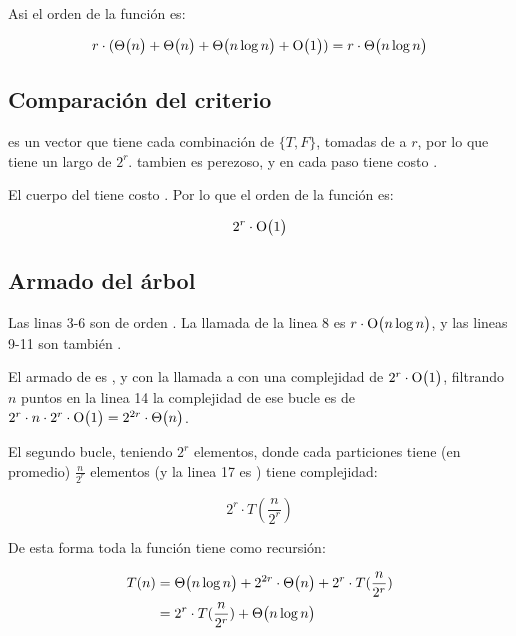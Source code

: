 Asi el orden de la función  es:

\[ r \cdot (\mathrm{\Theta}\bigl(n\bigr)+\mathrm{\Theta}\bigl(n\bigr)+\mathrm{\Theta}\bigl(n \log{n}\bigr) + \mathrm{O}\bigl(1\bigr)) \\
   = r \cdot \mathrm{\Theta}\bigl(n \log{n}\bigr)  \]

\subsection{Comparación del criterio}


 es un vector que tiene cada combinación de \(\{ T, F \}\),
tomadas de a \(r\), por lo que tiene un largo de \(2^r\). 
tambien es perezoso, y en cada paso tiene costo .

El cuerpo del  tiene costo . Por lo que el orden de la función es:

\[ 2^r \cdot \mathrm{O}\bigl(1\bigr) \]


\subsection{Armado del árbol}


Las linas 3-6 son de orden . La llamada de la linea 8 es
\(r \cdot \mathrm{O}\bigl(n \log{n}\bigr)\), y las lineas 9-11 son también .

El armado de  es , y con la llamada
a  con una complejidad de \(2^r \cdot \mathrm{O}\bigl(1\bigr)\),
filtrando \(n\) puntos en la linea 14 la complejidad de ese bucle es de
\( 2^r \cdot n \cdot 2^r \cdot \mathrm{O}\bigl(1\bigr) = 2^{2r} \cdot \mathrm{\Theta}\bigl(n\bigr)\).

El segundo bucle, teniendo  \(2^r\)
elementos, donde cada particiones tiene (en promedio)
\(\frac{n}{2^r}\) elementos (y la linea 17 es ) tiene complejidad:

\[2^r \cdot T(\frac{n}{2^r}) \]



De esta forma toda la función tiene como recursión:

\begin{equation*}
  \begin{split}
   T(n) &= \mathrm{\Theta}\bigl(n \log{n}\bigr) + 2^{2r} \cdot \mathrm{\Theta}\bigl(n\bigr) + 2^r \cdot
   T(\frac{n}{2^r}) \\
        &= 2^r \cdot T(\frac{n}{2^r}) + \mathrm{\Theta}\bigl(n \log{n}\bigr)
  \end{split}
\end{equation*}


